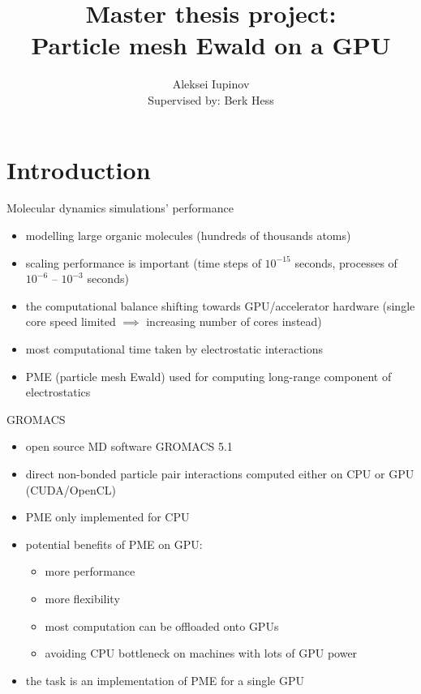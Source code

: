 \documentclass[11pt]{beamer}
\author[Aleksei Iupinov]{Aleksei Iupinov \\{\footnotesize Supervised by: Berk Hess}}
\title{Master thesis project: \\Particle mesh Ewald on a GPU}
\institute{KTH Royal Institute of Technology}
\begin{document}
\captionsetup[figure]{labelformat=empty}

\begin{frame}
\titlepage
\end{frame}


\section{Introduction}
\begin{frame}{Molecular dynamics simulations' performance}
\begin{itemize}
\item modelling large organic molecules (hundreds of thousands atoms)
\item scaling performance is important (time steps of $10^{-15}$ seconds, processes of $10^{-6}$ -- $10^{-3}$ seconds) 
\item the computational balance shifting towards GPU/accelerator hardware (single core speed limited $\implies$ increasing number of cores instead)
\item most computational time taken by electrostatic interactions
\item PME (particle mesh Ewald) used for computing long-range component of electrostatics
\end{itemize}
\end{frame}

\begin{frame}{GROMACS}
\begin{itemize}
\item open source MD software GROMACS 5.1
\item direct non-bonded particle pair interactions computed either on CPU or GPU (CUDA/OpenCL) 
\item PME only implemented for CPU
\item potential benefits of PME on GPU:
\begin{itemize}
\item more performance
\item more flexibility 
\item most computation can be offloaded onto GPUs
\item avoiding CPU bottleneck on machines with lots of GPU power  
\end{itemize}
\item the task is an implementation of  PME for a single GPU
\end{itemize}
\end{frame}
\end{document}
